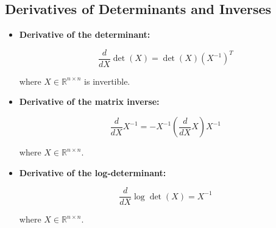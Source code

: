 \documentclass[../main.tex]{subfiles}
\begin{document}
\subsection{Derivatives of Determinants and Inverses}



\begin{itemize}

    \item \textbf{Derivative of the determinant:}

    \begin{equation}
    \frac{d}{dX} \det(X) = \det(X) (X^{-1})^T
    \end{equation}

    where $X \in \mathbb{R}^{n \times n}$ is invertible.



    \item \textbf{Derivative of the matrix inverse:}

    \begin{equation}
    \frac{d}{dX} X^{-1} = -X^{-1} \left( \frac{d}{dX} X \right) X^{-1}
    \end{equation}

    where $X \in \mathbb{R}^{n \times n}$.



    \item \textbf{Derivative of the log-determinant:}

    \begin{equation}
    \frac{d}{dX} \log \det(X) = X^{-1}
    \end{equation}

    where $X \in \mathbb{R}^{n \times n}$.

\end{itemize}
\end{document}
